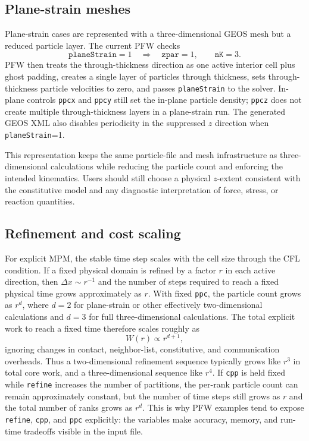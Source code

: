 \subsection{Plane-strain meshes}

Plane-strain cases are represented with a three-dimensional GEOS mesh but a reduced particle layer.  The current PFW checks
\begin{equation}
  \texttt{planeStrain}=1 \quad \Rightarrow \quad \texttt{zpar}=1, \qquad \texttt{nK}=3.
\end{equation}
PFW then treats the through-thickness direction as one active interior cell plus ghost padding, creates a single layer of particles through thickness, sets through-thickness particle velocities to zero, and passes \texttt{planeStrain} to the solver.  In-plane controls \texttt{ppcx} and \texttt{ppcy} still set the in-plane particle density; \texttt{ppcz} does not create multiple through-thickness layers in a plane-strain run.  The generated GEOS XML also disables periodicity in the suppressed \(z\) direction when \texttt{planeStrain}=1.

This representation keeps the same particle-file and mesh infrastructure as three-dimensional calculations while reducing the particle count and enforcing the intended kinematics.  Users should still choose a physical \(z\)-extent consistent with the constitutive model and any diagnostic interpretation of force, stress, or reaction quantities.

\subsection{Refinement and cost scaling}

For explicit MPM, the stable time step scales with the cell size through the CFL condition.  If a fixed physical domain is refined by a factor \(r\) in each active direction, then \(\Delta x\sim r^{-1}\) and the number of steps required to reach a fixed physical time grows approximately as \(r\).  With fixed \texttt{ppc}, the particle count grows as \(r^d\), where \(d=2\) for plane-strain or other effectively two-dimensional calculations and \(d=3\) for full three-dimensional calculations.  The total explicit work to reach a fixed time therefore scales roughly as
\begin{equation}
  W(r) \propto r^{d+1},
\end{equation}
ignoring changes in contact, neighbor-list, constitutive, and communication overheads.  Thus a two-dimensional refinement sequence typically grows like \(r^3\) in total core work, and a three-dimensional sequence like \(r^4\).  If \texttt{cpp} is held fixed while \texttt{refine} increases the number of partitions, the per-rank particle count can remain approximately constant, but the number of time steps still grows as \(r\) and the total number of ranks grows as \(r^d\).  This is why PFW examples tend to expose \texttt{refine}, \texttt{cpp}, and \texttt{ppc} explicitly: the variables make accuracy, memory, and run-time tradeoffs visible in the input file.

